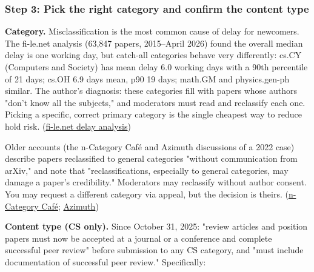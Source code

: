 \documentclass[twocolumn,10pt,letterpaper]{article}
\begin{document}
\subsubsection{Step 3: Pick the right category and confirm the content type}

\textbf{Category.} Misclassification is the most common cause of delay for newcomers. The fi-le.net analysis (63,847 papers, 2015–April 2026) found the overall median delay is one working day, but catch-all categories behave very differently: cs.CY (Computers and Society) has mean delay 6.0 working days with a 90th percentile of 21 days; cs.OH 6.9 days mean, p90 19 days; math.GM and physics.gen-ph similar. The author's diagnosis: these categories fill with papers whose authors "don't know all the subjects," and moderators must read and reclassify each one. Picking a specific, correct primary category is the single cheapest way to reduce hold risk. (\href{https://fi-le.net/arxiv/}{fi-le.net delay analysis})


Older accounts (the n-Category Café and Azimuth discussions of a 2022 case) describe papers reclassified to general categories "without communication from arXiv," and note that "reclassifications, especially to general categories, may damage a paper's credibility." Moderators may reclassify without author consent. You may request a different category via appeal, but the decision is theirs. (\href{https://golem.ph.utexas.edu/category/2022/02/submission\_to\_arxiv.html}{n-Category Café}; \href{https://johncarlosbaez.wordpress.com/2022/02/04/submission-to-arxiv/}{Azimuth})


\textbf{Content type (CS only).} Since October 31, 2025: "review articles and position papers must now be accepted at a journal or a conference and complete successful peer review" before submission to any CS category, and "must include documentation of successful peer review." Specifically:
\end{document}
